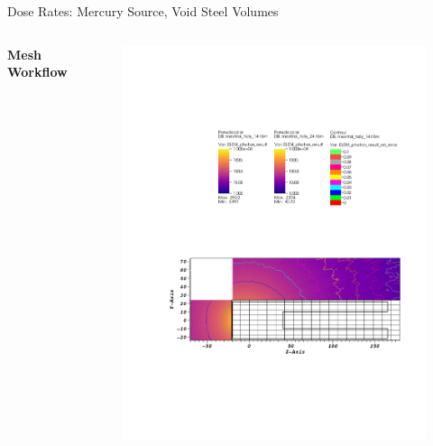 \documentclass{beamer}
\begin{document}
\begin{frame}{Dose Rates: Mercury Source, Void Steel Volumes}
\begin{columns}[T]
        \textbf{Mesh Workflow}
        \begin{figure}
                \centering
                \includegraphics[scale=0.49,trim={2.5cm 6cm 1cm 15cm},clip]{figs/dose_mer_mesh_void.pdf}
        \end{figure}


\end{columns}
\end{frame}
\end{document}
